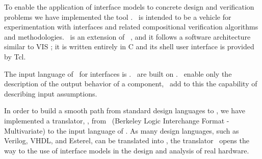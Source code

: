 To enable the application of interface models to concrete design and
verification problems we have implemented the tool
\textbf{\chai}. \chai\ is intended to be a vehicle for
experimentation with interfaces and related compositional
verification algorithms and methodologies. \chai\ is an extension
of \mocha\ \cite{Mo98}, and it follows a software architecture
similar to VIS \cite{VIS96}; it is written entirely in C and its
shell user interface is provided by Tcl. 

The input language of \chai \ for interfaces is {\im}.  \im \ are
built on {\rm} \cite{RM96journal}. \rm \ enable only the
description of the output behavior of a component, \im \ add to
this the capability of describing input assumptions.

In order to build a smooth path from standard design languages to
\chai, we have implemented a translator, \mvrm, from \mv\
(Berkeley Logic Interchange Format - Multivariate) \cite{vl2mv} to
the input language of \chai. As many design languages, such as
Verilog, VHDL, and Esterel, can be translated into \mv, the
translator \mvrm\ opens the way to the use of interface models in
the design and analysis of real hardware.

